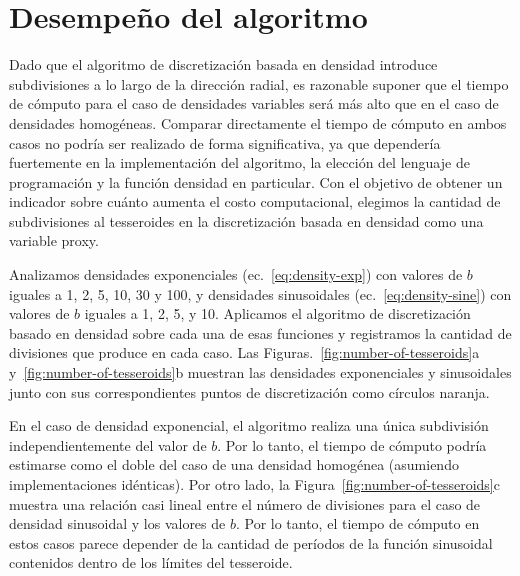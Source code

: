 
\section{Desempeño del algoritmo}

Dado que el algoritmo de discretización basada en densidad introduce
subdivisiones a lo largo de la dirección radial, es razonable suponer que el
tiempo de cómputo para el caso de densidades variables será más alto que en el
caso de densidades homogéneas.
Comparar directamente el tiempo de cómputo en ambos casos no podría ser
realizado de forma significativa, ya que dependería fuertemente en la
implementación del algoritmo, la elección del lenguaje de programación y la
función densidad en particular.
Con el objetivo de obtener un indicador sobre cuánto aumenta el costo
computacional, elegimos la cantidad de subdivisiones al tesseroides en la
discretización basada en densidad como una variable proxy.

Analizamos densidades exponenciales (ec.~\ref{eq:density-exp}) con valores de
$b$ iguales a 1, 2, 5, 10, 30 y 100, y densidades sinusoidales
(ec.~\ref{eq:density-sine}) con valores de $b$ iguales a 1, 2, 5, y 10.
Aplicamos el algoritmo de discretización basado en densidad sobre cada una de
esas funciones y registramos la cantidad de divisiones que produce en cada
caso.
Las Figuras.~\ref{fig:number-of-tesseroids}a y~\ref{fig:number-of-tesseroids}b
muestran las densidades exponenciales y sinusoidales junto con sus
correspondientes puntos de discretización como círculos naranja.

En el caso de densidad exponencial, el algoritmo realiza una única subdivisión
independientemente del valor de $b$.
Por lo tanto, el tiempo de cómputo podría estimarse como el doble del caso de
una densidad homogénea (asumiendo implementaciones idénticas).
Por otro lado, la Figura~\ref{fig:number-of-tesseroids}c muestra una relación
casi lineal entre el número de divisiones para el caso de densidad sinusoidal
y los valores de $b$.
Por lo tanto, el tiempo de cómputo en estos casos parece depender de la
cantidad de períodos de la función sinusoidal contenidos dentro de los límites
del tesseroide.

